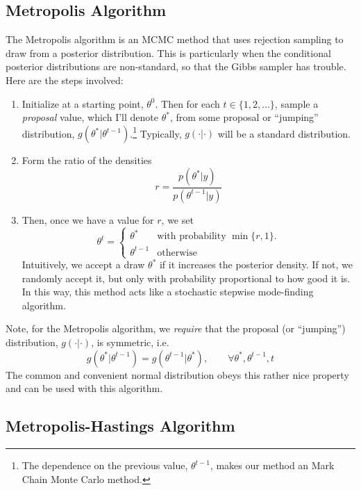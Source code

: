 \documentclass[a4paper,12pt]{scrartcl}
\begin{document}
\newpage
\subsection{Metropolis Algorithm}

The Metropolis algorithm is an MCMC method that uses rejection 
sampling to draw from a posterior distribution. This is particularly
when the conditional posterior distributions are non-standard, so
that the Gibbs sampler has trouble. Here are the steps involved:
\begin{enumerate}
   \item Initialize at a starting point, $\theta^0$. 
      Then for each $t \in \{1, 2, \ldots\}$, 
      sample a \emph{proposal} value, which I'll denote 
      $\theta^*$, from some proposal or ``jumping'' distribution,
      $g(\theta^* | \theta^{t-1})$.\footnote{The
      dependence on the previous value, $\theta^{t-1}$, makes
      our method an Mark Chain Monte Carlo method.} 
      Typically, $g(\cdot | \cdot)$ will be a standard distribution.
   \item Form the ratio of the densities 
      \begin{equation}
	 \label{metalg}
	 r = \frac{p(\theta^* | y)}{p(\theta^{t-1} | y)} 
      \end{equation}
   \item Then, once we have a value for $r$, we set
      \begin{equation}
	 \label{accept}
	  \theta^t = \begin{cases} \theta^* & \text{with probability
	    $\min\{r,1\}$.} \\ \theta^{t-1} & \text{otherwise}
	 \end{cases}
      \end{equation}
      Intuitively, we accept a draw $\theta^*$ if it increases 
      the posterior density. If not, we randomly accept
      it, but only with probability proportional to how good it is.
      In this way, this method acts like a stochastic 
      stepwise mode-finding algorithm.
\end{enumerate}
Note, for the Metropolis algorithm, we \emph{require} that the 
proposal (or ``jumping'') distribution, $g(\cdot | \cdot)$, is 
symmetric, i.e.
\[ g(\theta^* | \theta^{t-1}) = g( \theta^{t-1} |\theta^* ), 
   \qquad \forall \theta^*, \theta^{t-1}, t  \]
The common and convenient normal distribution obeys this rather nice
property and can be used with this algorithm.

\subsection{Metropolis-Hastings Algorithm}
\end{document}
